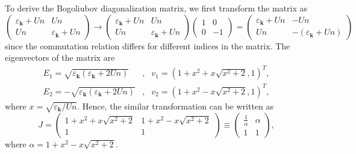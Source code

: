 \documentclass[aps,onecolumn,superscriptaddress,notitlepage,longbibliography]{revtex4-1}
\newcommand{\tmmathbf}[1]{\ensuremath{\boldsymbol{#1}}}
\begin{document}
To derive the Bogoliubov diagonalization matrix, we first transform the matrix
as
\begin{equation}
  \left(\begin{array}{cc}
    \varepsilon_{\tmmathbf{k}} + U n & U n\\
    U n & \varepsilon_{\tmmathbf{k}} + U n
  \end{array}\right) \rightarrow \left(\begin{array}{cc}
    \varepsilon_{\tmmathbf{k}} + U n & U n\\
    U n & \varepsilon_{\tmmathbf{k}} + U n
  \end{array}\right) \left(\begin{array}{cc}
    1 & 0\\
    0 & - 1
  \end{array}\right) = \left(\begin{array}{cc}
    \varepsilon_{\tmmathbf{k}} + U n & - U n\\
    U n & - (\varepsilon_{\tmmathbf{k}} + U n)
  \end{array}\right)
\end{equation}
since the commutation relation differs for different indices in the matrix.
The eigenvectors of the matrix are
\begin{eqnarray}
  E_1 = \sqrt{\varepsilon_{\tmmathbf{k}} (\varepsilon_{\tmmathbf{k}} + 2 U n)}
  & , & v_1 = \left( 1 + x^2 + x \sqrt{x^2 + 2}, 1 \right)^T, \\
  E_2 = - \sqrt{\varepsilon_{\tmmathbf{k}} (\varepsilon_{\tmmathbf{k}} + 2 U
  n)} & , & v_2 = \left( 1 + x^2 - x \sqrt{x^2 + 2}, 1 \right)^T, 
\end{eqnarray}
where $x = \sqrt{\varepsilon_{\tmmathbf{k}} / U n}$. Hence, the similar
transformation can be written as
\begin{equation}
  J = \left(\begin{array}{cc}
    1 + x^2 + x \sqrt{x^2 + 2} & 1 + x^2 - x \sqrt{x^2 + 2}\\
    1 & 1
  \end{array}\right) \equiv \left(\begin{array}{cc}
    \frac{1}{\alpha} & \alpha\\
    1 & 1
  \end{array}\right),
\end{equation}
where $\alpha = 1 + x^2 - x \sqrt{x^2 + 2}$.
\end{document}

